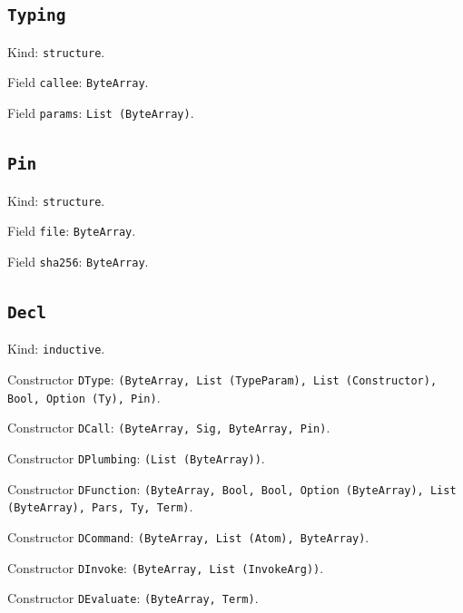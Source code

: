 \documentclass[11pt]{article}
\begin{document}
\subsection*{\texttt{Typing}}
\noindent Kind: \texttt{structure}.\par
\noindent Field \texttt{callee}: \texttt{ByteArray}.\par
\noindent Field \texttt{params}: \texttt{List (ByteArray)}.\par
\subsection*{\texttt{Pin}}
\noindent Kind: \texttt{structure}.\par
\noindent Field \texttt{file}: \texttt{ByteArray}.\par
\noindent Field \texttt{sha256}: \texttt{ByteArray}.\par
\subsection*{\texttt{Decl}}
\noindent Kind: \texttt{inductive}.\par
\noindent Constructor \texttt{DType}: \texttt{(ByteArray, List (TypeParam), List (Constructor), Bool, Option (Ty), Pin)}.\par
\noindent Constructor \texttt{DCall}: \texttt{(ByteArray, Sig, ByteArray, Pin)}.\par
\noindent Constructor \texttt{DPlumbing}: \texttt{(List (ByteArray))}.\par
\noindent Constructor \texttt{DFunction}: \texttt{(ByteArray, Bool, Bool, Option (ByteArray), List (ByteArray), Pars, Ty, Term)}.\par
\noindent Constructor \texttt{DCommand}: \texttt{(ByteArray, List (Atom), ByteArray)}.\par
\noindent Constructor \texttt{DInvoke}: \texttt{(ByteArray, List (InvokeArg))}.\par
\noindent Constructor \texttt{DEvaluate}: \texttt{(ByteArray, Term)}.\par
\end{document}
